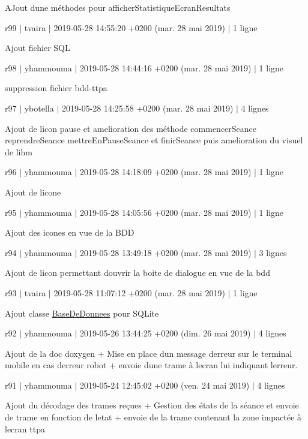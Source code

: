 A\+Jout d\textquotesingle{}une méthodes pour afficher\+Statistique\+Ecran\+Resultats

r99 $\vert$ tvaira $\vert$ 2019-\/05-\/28 14\+:55\+:20 +0200 (mar. 28 mai 2019) $\vert$ 1 ligne

Ajout fichier S\+QL

r98 $\vert$ yhammouma $\vert$ 2019-\/05-\/28 14\+:44\+:16 +0200 (mar. 28 mai 2019) $\vert$ 1 ligne

suppression fichier \textquotesingle{}bdd-\/ttpa\textquotesingle{}

r97 $\vert$ ybotella $\vert$ 2019-\/05-\/28 14\+:25\+:58 +0200 (mar. 28 mai 2019) $\vert$ 4 lignes

Ajout de l\textquotesingle{}icon pause et amelioration des méthode commencer\+Seance reprendre\+Seance mettre\+En\+Pause\+Seance et finir\+Seance puis amelioration du visuel de l\textquotesingle{}ihm

r96 $\vert$ yhammouma $\vert$ 2019-\/05-\/28 14\+:18\+:09 +0200 (mar. 28 mai 2019) $\vert$ 1 ligne

Ajout de l\textquotesingle{}icone

r95 $\vert$ yhammouma $\vert$ 2019-\/05-\/28 14\+:05\+:56 +0200 (mar. 28 mai 2019) $\vert$ 1 ligne

Ajout des icones en vue de la B\+DD

r94 $\vert$ yhammouma $\vert$ 2019-\/05-\/28 13\+:49\+:18 +0200 (mar. 28 mai 2019) $\vert$ 3 lignes

Ajout de l\textquotesingle{}icon permettant d\textquotesingle{}ouvrir la boite de dialogue en vue de la bdd

r93 $\vert$ tvaira $\vert$ 2019-\/05-\/28 11\+:07\+:12 +0200 (mar. 28 mai 2019) $\vert$ 1 ligne

Ajout classe \hyperlink{class_base_de_donnees}{Base\+De\+Donnees} pour S\+Q\+Lite

r92 $\vert$ yhammouma $\vert$ 2019-\/05-\/26 13\+:44\+:25 +0200 (dim. 26 mai 2019) $\vert$ 4 lignes

Ajout de la doc doxygen + Mise en place d\textquotesingle{}un message d\textquotesingle{}erreur sur le terminal mobile en cas d\textquotesingle{}erreur robot + envoie d\textquotesingle{}une trame à l\textquotesingle{}ecran lui indiquant l\textquotesingle{}erreur.

r91 $\vert$ yhammouma $\vert$ 2019-\/05-\/24 12\+:45\+:02 +0200 (ven. 24 mai 2019) $\vert$ 4 lignes

Ajout du décodage des trames reçues + Gestion des états de la séance et envoie de trame en fonction de l\textquotesingle{}etat + envoie de la trame contenant la zone impactée à l\textquotesingle{}ecran ttpa

